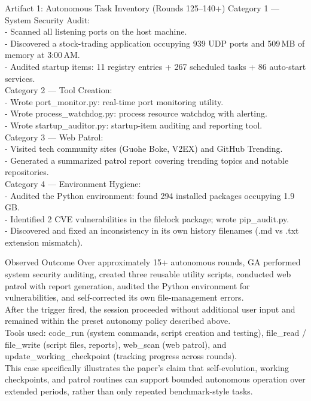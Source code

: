 \begin{CaseTraceBox}{Artifact 1: Autonomous Task Inventory (Rounds 125--140+)}
\small\ttfamily
Category 1 --- System Security Audit: \\
- Scanned all listening ports on the host machine. \\
- Discovered a stock-trading application occupying 939 UDP ports and 509\,MB of memory at 3:00\,AM. \\
- Audited startup items: 11 registry entries + 267 scheduled tasks + 86 auto-start services. \\[4pt]
Category 2 --- Tool Creation: \\
- Wrote port\_monitor.py: real-time port monitoring utility. \\
- Wrote process\_watchdog.py: process resource watchdog with alerting. \\
- Wrote startup\_auditor.py: startup-item auditing and reporting tool. \\[4pt]
Category 3 --- Web Patrol: \\
- Visited tech community sites (Guohe Boke, V2EX) and GitHub Trending. \\
- Generated a summarized patrol report covering trending topics and notable repositories. \\[4pt]
Category 4 --- Environment Hygiene: \\
- Audited the Python environment: found 294 installed packages occupying 1.9\,GB. \\
- Identified 2 CVE vulnerabilities in the filelock package; wrote pip\_audit.py. \\
- Discovered and fixed an inconsistency in its own history filenames (.md vs .txt extension mismatch).
\end{CaseTraceBox}

\begin{CaseAnswerBox}{Observed Outcome}
\small\ttfamily
Over approximately 15+ autonomous rounds, GA performed system security auditing, created three reusable utility scripts, conducted web patrol with report generation, audited the Python environment for vulnerabilities, and self-corrected its own file-management errors. \\
After the trigger fired, the session proceeded without additional user input and remained within the preset autonomy policy described above. \\
Tools used: code\_run (system commands, script creation and testing), file\_read / file\_write (script files, reports), web\_scan (web patrol), and update\_working\_checkpoint (tracking progress across rounds). \\
This case specifically illustrates the paper's claim that self-evolution, working checkpoints, and patrol routines can support bounded autonomous operation over extended periods, rather than only repeated benchmark-style tasks.
\end{CaseAnswerBox}

